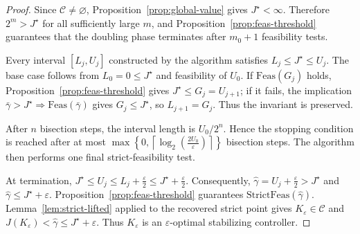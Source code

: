 \documentclass[10pt,a4paper]{amsart}
\providecommand{\cC}{\mathcal{C}}
\begin{document}
\begin{proof}
Since $\cC\neq\varnothing$, Proposition~\ref{prop:global-value}
gives $J^\star<\infty$. Therefore $2^m>J^\star$ for all
sufficiently large $m$, and Proposition~\ref{prop:feas-threshold}
guarantees that the doubling phase terminates after $m_0+1$
feasibility tests.

Every interval $[L_j,U_j]$ constructed by the algorithm satisfies
$L_j\le J^\star\le U_j$. The base case follows from
$L_0=0\le J^\star$ and feasibility of $U_0$. If
$\mathrm{Feas}(G_j)$ holds, Proposition~\ref{prop:feas-threshold}
gives $J^\star\le G_j=U_{j+1}$; if it fails, the implication
$\bar\gamma>J^\star\Rightarrow\mathrm{Feas}(\bar\gamma)$ gives
$G_j\le J^\star$, so $L_{j+1}=G_j$. Thus the invariant is
preserved.

After $n$ bisection steps, the interval length is $U_0/2^n$.
Hence the stopping condition is reached after at most
$
\max\left\{
0,
\left\lceil
\log_2\!\left(\frac{2U_0}{\varepsilon}\right)
\right\rceil
\right\}
$
bisection steps. The algorithm then performs one final
strict-feasibility test.

At termination,
$
J^\star\le U_j\le L_j+\frac{\varepsilon}{2}
\le J^\star+\frac{\varepsilon}{2}.
$
Consequently,
$\widehat\gamma=U_j+\frac{\varepsilon}{2}>J^\star$ and
$\widehat\gamma\le J^\star+\varepsilon$.
Proposition~\ref{prop:feas-threshold} guarantees
$\mathrm{StrictFeas}(\widehat\gamma)$. Lemma~\ref{lem:strict-lifted}
applied to the recovered strict point gives $K_\varepsilon\in\cC$
and
$
J(K_\varepsilon)<\widehat\gamma\le J^\star+\varepsilon.
$
Thus $K_\varepsilon$ is an $\varepsilon$-optimal stabilizing
controller.
\end{proof}
\end{document}
